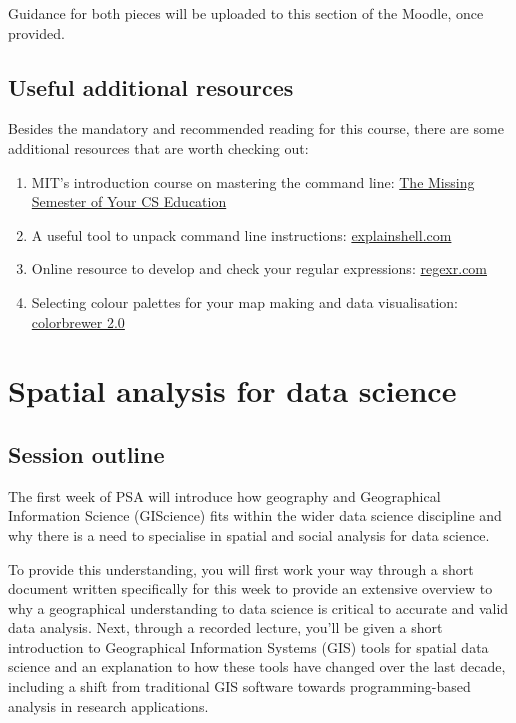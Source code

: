 \documentclass[
]{book}
\begin{document}
Guidance for both pieces will be uploaded to this section of the Moodle, once provided.

\hypertarget{useful-additional-resources}{%
\section*{Useful additional resources}\label{useful-additional-resources}}

Besides the mandatory and recommended reading for this course, there are some additional resources that are worth checking out:

\begin{enumerate}
\def\labelenumi{\arabic{enumi}.}
\item
  MIT's introduction course on mastering the command line: \href{https://missing.csail.mit.edu/}{The Missing Semester of Your CS Education}
\item
  A useful tool to unpack command line instructions: \href{https://www.explainshell.com/}{explainshell.com}
\item
  Online resource to develop and check your regular expressions: \href{https://regexr.com/5d21d}{regexr.com}
\item
  Selecting colour palettes for your map making and data visualisation: \href{https://colorbrewer2.org}{colorbrewer 2.0}
\end{enumerate}

\hypertarget{spatial-analysis-for-data-science}{%
\chapter{Spatial analysis for data science}\label{spatial-analysis-for-data-science}}

\hypertarget{session-outline}{%
\section{Session outline}\label{session-outline}}

The first week of PSA will introduce how geography and Geographical Information Science (GIScience) fits within the wider data science discipline and why there is a need to specialise in spatial and social analysis for data science.

To provide this understanding, you will first work your way through a short document written specifically for this week to provide an extensive overview to why a geographical understanding to data science is critical to accurate and valid data analysis.
Next, through a recorded lecture, you'll be given a short introduction to Geographical Information Systems (GIS) tools for spatial data science and an explanation to how these tools have changed over the last decade, including a shift from traditional GIS software towards programming-based analysis in research applications.
\end{document}
